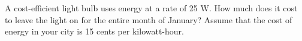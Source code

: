 A cost-efficient light bulb uses energy at a rate of 25 W. How
much does it cost to leave the light on for the entire month of
January? Assume that the cost of energy in your city is 15 cents
per kilowatt-hour.
